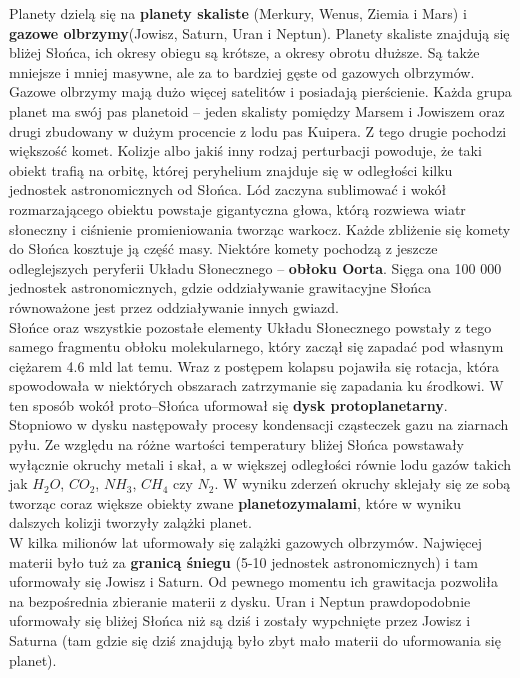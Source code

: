 \documentclass[../index.tex]{subfiles}
\begin{document}
        Planety dzielą się na \textbf{planety skaliste} (Merkury, Wenus, Ziemia i Mars) i \textbf{gazowe olbrzymy}(Jowisz, Saturn, Uran i Neptun). Planety skaliste znajdują się bliżej Słońca, ich okresy obiegu są krótsze, a okresy obrotu dłuższe. Są także mniejsze i mniej masywne, ale za to bardziej gęste od gazowych olbrzymów. Gazowe olbrzymy mają dużo więcej satelitów i posiadają pierścienie. Każda grupa planet ma swój pas planetoid – jeden skalisty pomiędzy Marsem i Jowiszem oraz drugi zbudowany w dużym procencie z lodu pas Kuipera. Z tego drugie pochodzi większość komet. Kolizje albo jakiś inny rodzaj perturbacji powoduje, że taki obiekt trafią na orbitę, której peryhelium znajduje się w odległości kilku jednostek astronomicznych od Słońca. Lód zaczyna sublimować i wokół rozmarzającego obiektu powstaje gigantyczna głowa, którą rozwiewa wiatr słoneczny i ciśnienie promieniowania tworząc warkocz. Każde zbliżenie się komety do Słońca kosztuje ją część masy. Niektóre komety pochodzą z jeszcze odleglejszych peryferii Układu Słonecznego – \textbf{obłoku Oorta}. Sięga ona 100 000 jednostek astronomicznych, gdzie oddziaływanie grawitacyjne Słońca równoważone jest przez oddziaływanie innych gwiazd.\\
        Słońce oraz wszystkie pozostałe elementy Układu Słonecznego powstały z tego samego fragmentu obłoku molekularnego, który zaczął się zapadać pod własnym ciężarem 4.6 mld lat temu. Wraz z postępem kolapsu pojawiła się rotacja, która spowodowała w niektórych obszarach zatrzymanie się zapadania ku środkowi. W ten sposób wokół proto–Słońca uformował się \textbf{dysk protoplanetarny}. Stopniowo w dysku następowały procesy kondensacji cząsteczek gazu na ziarnach pyłu. Ze względu na różne wartości temperatury bliżej Słońca powstawały wyłącznie okruchy metali i skał, a w większej odległości równie lodu gazów takich jak \(H_2 O\), \(CO_2\), \(NH_3\), \(CH_4\) czy \(N_2\). W wyniku zderzeń okruchy sklejały się ze sobą tworząc coraz większe obiekty zwane \textbf{planetozymalami}, które w wyniku dalszych kolizji tworzyły zalążki planet.\\
        W kilka milionów lat uformowały się zalążki gazowych olbrzymów. Najwięcej materii było tuż za \textbf{granicą śniegu} (5-10 jednostek astronomicznych) i tam uformowały się Jowisz i Saturn. Od pewnego momentu ich grawitacja pozwoliła na bezpośrednia zbieranie materii z dysku. Uran i Neptun prawdopodobnie uformowały się bliżej Słońca niż są dziś i zostały wypchnięte przez Jowisz i Saturna (tam gdzie się dziś znajdują było zbyt mało materii do uformowania się planet).\\ 
\end{document}
